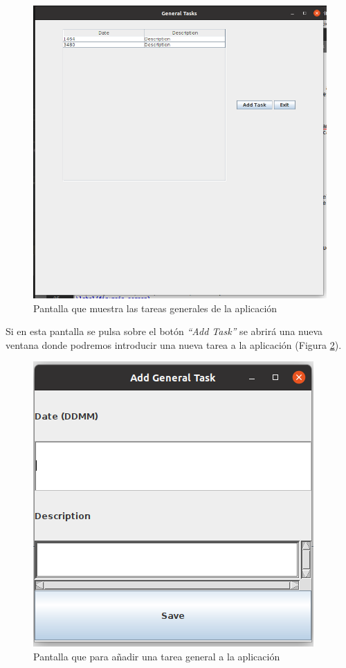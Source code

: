 \documentclass[10pt,a4paper]{article}
\begin{document}
\newpage
\begin{figure}[h!]
\centering
\includegraphics[scale=0.4]{images/general_task_screen.png}
\caption{Pantalla que muestra las tareas generales de la aplicación}
\label{fig:general_task_screen}
\end{figure}

Si en esta pantalla se pulsa sobre el botón \emph{``Add Task''} se abrirá una nueva ventana donde podremos introducir una nueva tarea a la aplicación (Figura \ref{fig:add_general_task_screen}).

\begin{figure}[h!]
\centering
\includegraphics[scale=0.6]{images/add_general_task_screen.png}
\caption{Pantalla que para añadir una tarea general a la aplicación}
\label{fig:add_general_task_screen}
\end{figure}
\end{document}
